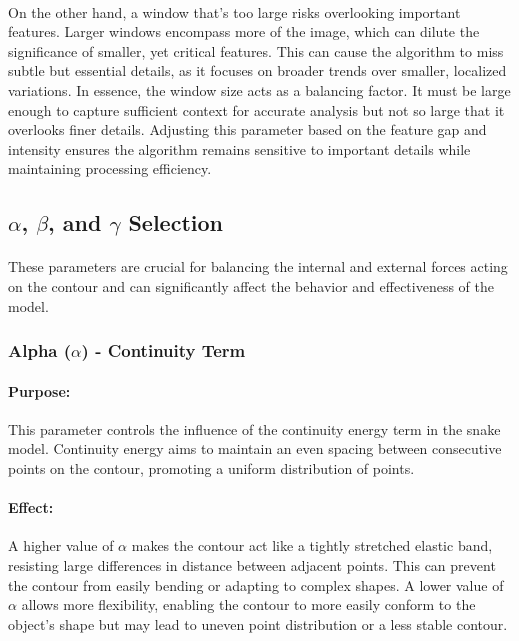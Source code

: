 \documentclass[12pt,a4paper]{report}
\begin{document}
\paragraph*{}
On the other hand, a window that's too large risks overlooking important features. Larger windows encompass more of the image, which can dilute the significance of smaller, yet critical features. This can cause the algorithm to miss subtle but essential details, as it focuses on broader trends over smaller, localized variations. In essence, the window size acts as a balancing factor. It must be large enough to capture sufficient context for accurate analysis but not so large that it overlooks finer details. Adjusting this parameter based on the feature gap and intensity ensures the algorithm remains sensitive to important details while maintaining processing efficiency.

\subsection{\(\alpha\), \(\beta\), and \(\gamma\) Selection}
\paragraph*{}
These parameters are crucial for balancing the internal and external forces acting on the contour and can significantly affect the behavior and effectiveness of the model.

\subsubsection*{Alpha (\(\alpha\)) - Continuity Term}
\paragraph*{Purpose:} 
This parameter controls the influence of the continuity energy term in the snake model. Continuity energy aims to maintain an even spacing between consecutive points on the contour, promoting a uniform distribution of points.
\paragraph*{Effect:}
A higher value of \(\alpha\) makes the contour act like a tightly stretched elastic band, resisting large differences in distance between adjacent points. This can prevent the contour from easily bending or adapting to complex shapes.
A lower value of \(\alpha\) allows more flexibility, enabling the contour to more easily conform to the object's shape but may lead to uneven point distribution or a less stable contour.
\end{document}

